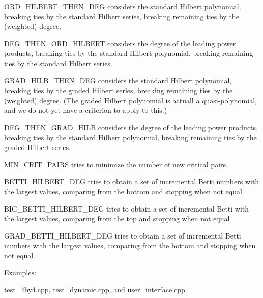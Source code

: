 \begin{DoxyEnumerate}
\item {\ttfamily O\+R\+D\+\_\+\+H\+I\+L\+B\+E\+R\+T\+\_\+\+T\+H\+E\+N\+\_\+\+D\+EG} considers the standard Hilbert polynomial, breaking ties by the standard Hilbert series, breaking remaining ties by the (weighted) degree.
\item {\ttfamily D\+E\+G\+\_\+\+T\+H\+E\+N\+\_\+\+O\+R\+D\+\_\+\+H\+I\+L\+B\+E\+RT} considers the degree of the leading power products, breaking ties by the standard Hilbert polynomial, breaking remaining ties by the standard Hilbert series.
\item {\ttfamily G\+R\+A\+D\+\_\+\+H\+I\+L\+B\+\_\+\+T\+H\+E\+N\+\_\+\+D\+EG} considers the standard Hilbert polynomial, breaking ties by the graded Hilbert series, breaking remaining ties by the (weighted) degree. (The graded Hilbert polynomial is actuall a quasi-\/polynomial, and we do not yet have a criterion to apply to this.)
\item {\ttfamily D\+E\+G\+\_\+\+T\+H\+E\+N\+\_\+\+G\+R\+A\+D\+\_\+\+H\+I\+LB} considers the degree of the leading power products, breaking ties by the standard Hilbert polynomial, breaking remaining ties by the graded Hilbert series.
\item {\ttfamily M\+I\+N\+\_\+\+C\+R\+I\+T\+\_\+\+P\+A\+I\+RS} tries to minimize the number of new critical pairs.
\item {\ttfamily B\+E\+T\+T\+I\+\_\+\+H\+I\+L\+B\+E\+R\+T\+\_\+\+D\+EG} tries to obtain a set of incremental Betti numbers with the largest values, comparing from the bottom and stopping when not equal
\item {\ttfamily B\+I\+G\+\_\+\+B\+E\+T\+T\+I\+\_\+\+H\+I\+L\+B\+E\+R\+T\+\_\+\+D\+EG} tries to obtain a set of incremental Betti with the largest values, comparing from the top and stopping when not equal
\item {\ttfamily G\+R\+A\+D\+\_\+\+B\+E\+T\+T\+I\+\_\+\+H\+I\+L\+B\+E\+R\+T\+\_\+\+D\+EG} tries to obtain a set of incremental Betti numbers with the largest values, comparing from the bottom and stopping when not equal 
\end{DoxyEnumerate}\begin{Desc}
\item[Examples\+: ]\par
\hyperlink{test_4by4_8cpp-example}{test\+\_\+4by4.\+cpp}, \hyperlink{test_dynamic_8cpp-example}{test\+\_\+dynamic.\+cpp}, and \hyperlink{user_interface_8cpp-example}{user\+\_\+interface.\+cpp}.\end{Desc}


